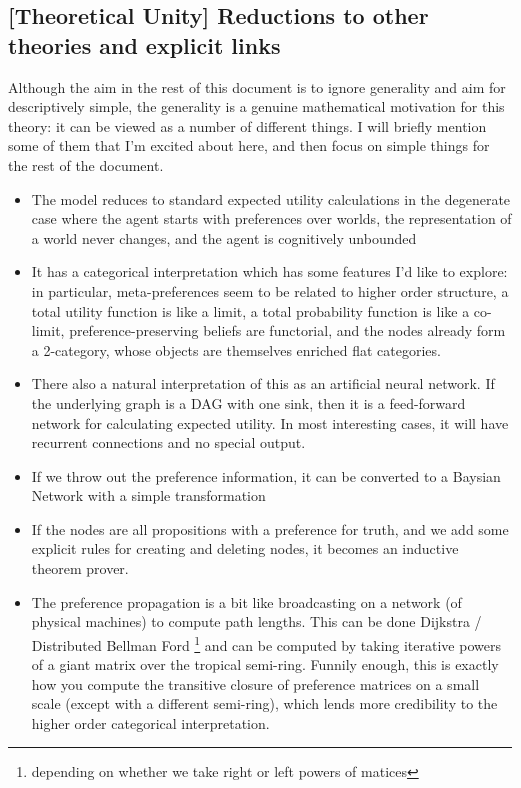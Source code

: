 \documentclass{article}
\begin{document}
	\subsection*{[Theoretical Unity] Reductions to other theories and explicit links}
	Although the aim in the rest of this document is to ignore generality and aim for descriptively simple, the generality is a genuine mathematical motivation for this theory: it can be viewed as a number of different things. I will briefly mention some of them that I'm excited about here, and then focus on simple things for the rest of the document.
	\begin{itemize}[nosep]
		\item The model reduces to standard expected utility calculations in the degenerate case where the agent starts with preferences over worlds, the representation of a world never changes, and the agent is cognitively unbounded
		\item It has a categorical interpretation which has some features I'd like to explore: in particular, meta-preferences seem to be related to higher order structure, a total utility function is like a limit, a total probability function is like a co-limit, preference-preserving beliefs are functorial, and the nodes already form a 2-category, whose objects are themselves enriched flat categories.
		\item There also a natural interpretation of this as an artificial neural network. If the underlying graph is a DAG with one sink, then it is a feed-forward network for calculating expected utility. In most interesting cases, it will have recurrent connections and no special output.
		\item If we throw out the preference information, it can be converted to a Baysian Network with a simple transformation
		\item If the nodes are all propositions with a preference for truth, and we add some explicit rules for creating and deleting nodes, it becomes an inductive theorem prover.
		\item The preference propagation is a bit like broadcasting on a network (of physical machines) to compute path lengths. This can be done Dijkstra / Distributed Bellman Ford \footnote{depending on whether we take right or left powers of matices} and can be computed by taking iterative powers of a giant matrix over the tropical semi-ring. Funnily enough, this is exactly how you compute the transitive closure of preference matrices on a small scale (except with a different semi-ring), which lends more credibility to the higher order categorical interpretation.
	\end{itemize}
\end{document}
